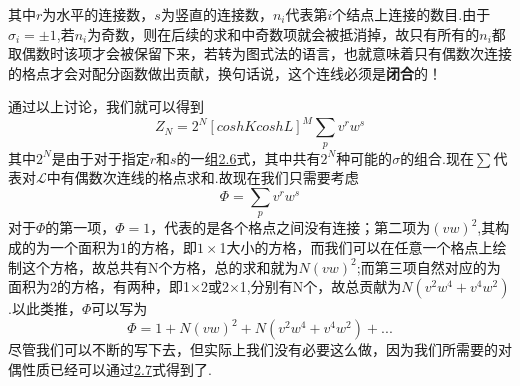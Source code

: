 \documentclass[a4paper]{book}
\begin{document}
其中$r$为水平的连接数，$s$为竖直的连接数，$n_i$代表第$i$个结点上连接的数目.由于$\sigma_i=\pm1$,若$n_i$为奇数，则在后续的求和中奇数项就会被抵消掉，故只有所有的$n_i$都取偶数时该项才会被保留下来，若转为图式法的语言，也就意味着只有偶数次连接的格点才会对配分函数做出贡献，换句话说，这个连线必须是\textbf{闭合}的！\par 
通过以上讨论，我们就可以得到
\begin{equation}\label{2.7}
	Z_N=2^N[coshKcoshL]^M\sum_{p}v^rw^s
\end{equation}
其中$2^N$是由于对于指定$r$和$s$的一组\hyperref[2.6]{2.6}式，其中共有$2^N$种可能的$\sigma$的组合.现在$\sum$代表对$\mathcal{L}$中有偶数次连线的格点求和.故现在我们只需要考虑
\begin{equation}
	\varPhi=\sum_{p}v^rw^s
\end{equation}
对于$\varPhi$的第一项，$\varPhi=1$，代表的是各个格点之间没有连接；第二项为$(vw)^2$,其构成的为一个面积为1的方格，即$1\times$1大小的方格，而我们可以在任意一个格点上绘制这个方格，故总共有N个方格，总的求和就为$N(vw)^2$;而第三项自然对应的为面积为2的方格，有两种，即1$\times$2或2$\times$1,分别有N个，故总贡献为$N(v^2w^4+v^4w^2)$.以此类推，$\varPhi$可以写为
\begin{equation}
	\varPhi=1+N(vw)^2+N(v^2w^4+v^4w^2)+...
\end{equation}
尽管我们可以不断的写下去，但实际上我们没有必要这么做，因为我们所需要的对偶性质已经可以通过\hyperref[2.7]{2.7}式得到了.
\end{document}
